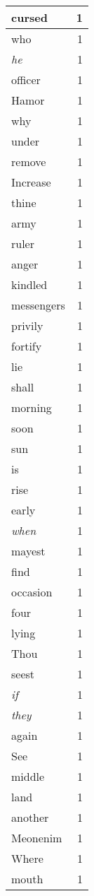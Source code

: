 \begin{center}
\begin{longtable}{l|r}
cursed & 1\\ \hline 
who & 1\\ \hline 
\emph{he} & 1\\ \hline 
officer & 1\\ \hline 
Hamor & 1\\ \hline 
why & 1\\ \hline 
under & 1\\ \hline 
remove & 1\\ \hline 
Increase & 1\\ \hline 
thine & 1\\ \hline 
army & 1\\ \hline 
ruler & 1\\ \hline 
anger & 1\\ \hline 
kindled & 1\\ \hline 
messengers & 1\\ \hline 
privily & 1\\ \hline 
fortify & 1\\ \hline 
lie & 1\\ \hline 
shall & 1\\ \hline 
morning & 1\\ \hline 
soon & 1\\ \hline 
sun & 1\\ \hline 
is & 1\\ \hline 
rise & 1\\ \hline 
early & 1\\ \hline 
\emph{when} & 1\\ \hline 
mayest & 1\\ \hline 
find & 1\\ \hline 
occasion & 1\\ \hline 
four & 1\\ \hline 
lying & 1\\ \hline 
Thou & 1\\ \hline 
seest & 1\\ \hline 
\emph{if} & 1\\ \hline 
\emph{they} & 1\\ \hline 
again & 1\\ \hline 
See & 1\\ \hline 
middle & 1\\ \hline 
land & 1\\ \hline 
another & 1\\ \hline 
Meonenim & 1\\ \hline 
Where & 1\\ \hline 
mouth & 1\\ \hline 

\end{longtable}
\end{center}

